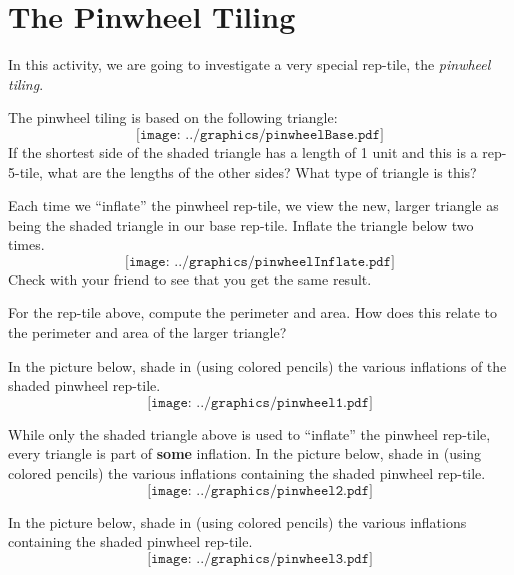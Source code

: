 \newpage
\section{The Pinwheel Tiling}

In this activity, we are going to investigate a very special rep-tile,
the \textit{pinwheel tiling}.

\begin{prob}
The pinwheel tiling is based on the following triangle:
\[
\texttt{[image: ../graphics/pinwheelBase.pdf]}
\]
If the shortest side of the shaded triangle has a length of 1 unit and this is a rep-5-tile,
what are the lengths of the other sides? What type of triangle is
this?
\end{prob}

\begin{prob}
Each time we ``inflate'' the pinwheel rep-tile, we view the new, larger
triangle as being the shaded triangle in our base rep-tile. Inflate
the triangle below two times.
\[
\texttt{[image: ../graphics/pinwheelInflate.pdf]}
\]
Check with your friend to see that you get the same result.
\end{prob}


\begin{prob}
For the rep-tile above, compute the perimeter and area. How does this
relate to the perimeter and area of the larger triangle?
\end{prob}

\break

\begin{prob}
In the picture below, shade in (using colored pencils) the various
inflations of the shaded pinwheel rep-tile.
\[
\texttt{[image: ../graphics/pinwheel1.pdf]}
\]
\end{prob}


\begin{prob}
While only the shaded triangle above is used to ``inflate'' the
pinwheel rep-tile, every triangle is part of \textbf{some}
inflation. In the picture below, shade in (using colored pencils) the
various inflations containing the shaded pinwheel rep-tile.
\[
\texttt{[image: ../graphics/pinwheel2.pdf]}
\]
\end{prob}


\break

\begin{prob}
In the picture below, shade in (using colored pencils) the
various inflations containing the shaded pinwheel rep-tile.
\[
\texttt{[image: ../graphics/pinwheel3.pdf]}
\]
\end{prob}

